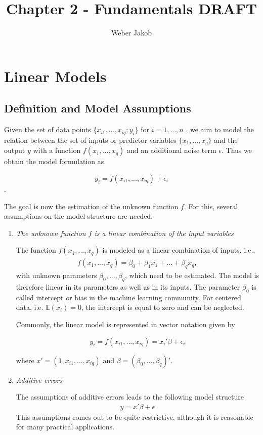 \documentclass[10pt,a4paper]{article}
\title{Chapter 2 - Fundamentals DRAFT}
\author{Weber Jakob}
\begin{document}
\maketitle

\section{Linear Models} \label{SectionLinModel}
	
\subsection{Definition and Model Assumptions}  \label{SubsectionLinModelDefAndAssump}

Given the set of data points $\{x_{i1}, ..., x_{iq}; y_i \}$ for $i = 1, ..., n$ , we aim to model the relation between the set of inputs or predictor variables $\{x_1, ..., x_q\}$ and the output $y$ with a function $f(x_1, ..., x_q)$ and an additional noise term $\epsilon$. Thus we obtain the model formulation as

\begin{equation}
	y_i = f(x_{i1}, ..., x_{iq}) + \epsilon_i
\end{equation}.

The goal is now the estimation of the unknown function $f$. For this, several assumptions on the model structure are needed:

\begin{enumerate}
	\item \emph{The unknown function $f$ is a linear combination of the input variables}
	
	The function $f(x_1, ..., x_q)$ is modeled as a linear combination of inputs, i.e.,
	\begin{align} \label{linCombOfInputs}
		f(x_1, ..., x_q) = \beta_0 + \beta_1 x_1 + ... + \beta_q x_q,
	\end{align}
	with unknown parameters $\beta_0, ..., \beta_q$, which need to be estimated. The model is therefore linear in its parameters as well as in its inputs. \cite{bishop2006patternRecognition} The parameter $\beta_0$ is called intercept or bias in the machine learning community. For centered data, i.e. $\mathbb{E}(x_i) = 0$, the intercept is equal to zero and can be neglected.
	
	Commonly, the linear model is represented in vector notation given by
	
	$$ y_i = f(x_{i1}, ..., x_{iq})  = x_i' \beta + \epsilon_i $$
	
	where $x' = (1, x_{i1}, \dots, x_{iq})$ and $\beta = (\beta_0, \dots, \beta_q)'$.
	
	\item \emph{Additive errors}
	
	The assumptions of additive errors leads to the following model structure
	\begin{align} \label{eq_linModelOneDim}
		y = x'\beta + \epsilon
	\end{align}
	This assumptions comes out to be quite restrictive, although it is reasonable for many practical applications.
\end{enumerate}
\end{document}
